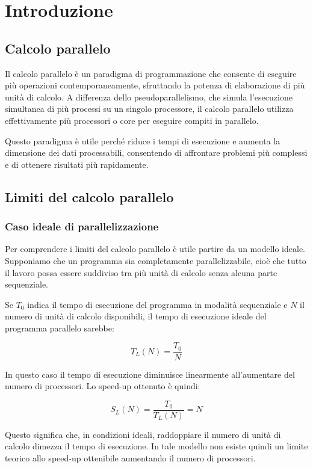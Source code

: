 \chapter{Introduzione}

\section{Calcolo parallelo}

Il calcolo parallelo è un paradigma di programmazione che consente di eseguire più operazioni contemporaneamente, sfruttando la potenza di elaborazione di più unità di calcolo. A differenza dello pseudoparallelismo, che simula l'esecuzione simultanea di più processi su un singolo processore, il calcolo parallelo utilizza effettivamente più processori o core per eseguire compiti in parallelo. 

Questo paradigma è utile perché riduce i tempi di esecuzione e aumenta la dimensione dei dati processabili, consentendo di affrontare problemi più complessi e di ottenere risultati più rapidamente. 

\section{Limiti del calcolo parallelo}

\subsection{Caso ideale di parallelizzazione}
Per comprendere i limiti del calcolo parallelo è utile partire da un modello ideale. 
Supponiamo che un programma sia completamente parallelizzabile, cioè che tutto il lavoro possa essere suddiviso tra più unità di calcolo senza alcuna parte sequenziale.

Se $T_0$ indica il tempo di esecuzione del programma in modalità sequenziale e $N$ il numero di unità di calcolo disponibili, il tempo di esecuzione ideale del programma parallelo sarebbe:

\[
T_L(N) = \frac{T_0}{N}
\]

In questo caso il tempo di esecuzione diminuisce linearmente all'aumentare del numero di processori. 
Lo speed-up ottenuto è quindi:

\[
S_L(N) = \frac{T_0}{T_L(N)} = N
\]

Questo significa che, in condizioni ideali, raddoppiare il numero di unità di calcolo dimezza il tempo di esecuzione. 
In tale modello non esiste quindi un limite teorico allo speed-up ottenibile aumentando il numero di processori.

